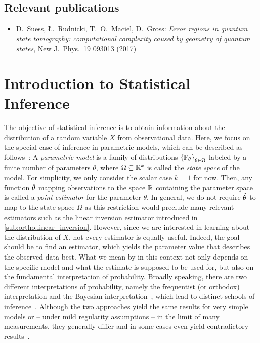 \subsection*{Relevant publications}
\begin{itemize}
  \item D.\ Suess, Ł.\ Rudnicki, T.\ O.\ Maciel, D.\ Gross: \textit{Error regions in quantum state tomography: computational complexity caused by geometry of quantum states}, New J.\ Phys.\ 19 093013 (2017)
\end{itemize}

\section{Introduction to Statistical Inference}%
\label{sec:error.stat}

The objective of statistical inference is to obtain information about the distribution of a random variable $X$ from observational data.
Here, we focus on the special case of inference in parametric models, which can be described as follows~\cite{Wasserman_2013_All}:
A \emph{parametric model} is a family of distributions ${\{\mathbb{P}_\theta\}}_{\theta \in \Omega}$ labeled by a finite number of parameters $\theta$, where $\Omega \subseteq {\mathbb{R}}^k$ is called the \emph{state space} of the model.
For simplicity, we only consider the scalar case $k=1$ for now.
Then, any function $\hat{\theta}$ mapping observations to the space ${\mathbb{R}}$ containing the parameter space is called a \emph{point estimator} for the parameter $\theta$.
In general, we do not require $\hat{\theta}$ to map to the state space $\Omega$ as this restriction would preclude many relevant estimators such as the linear inversion estimator introduced in \cref{sub:ortho.linear_inversion}.
However, since we are interested in learning about the distribution of $X$, not every estimator is equally useful.
Indeed, the goal should be to find an estimator, which yields the parameter value that describes the observed data best.
What we mean by  in this context not only depends on the specific model and what the estimate is supposed to be used for, but also on the fundamental interpretation of probability.
Broadly speaking, there are two different interpretations of probability, namely the frequentist (or orthodox) interpretation and the Bayesian interpretation~\cite{Hajek_2012_Interpretations,Caves_2000_Probabilities}, which lead to distinct schools of inference~\cite{Kiefer_2012_Introduction,Bolstad_2007_Introduction,Wasserman_2013_All}.
Although the two approaches yield the same results for very simple models or -- under mild regularity assumptions -- in the limit of many measurements, they generally differ and in some cases even yield contradictory results~\cite[Sec. 11.9]{Wasserman_2013_All}.


